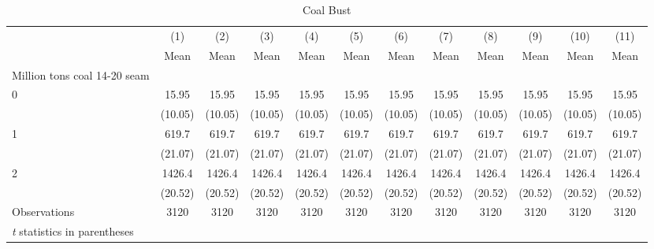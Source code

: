 \begin{table}[htbp]\centering
\caption{Coal Bust}
\begin{tabular}{l*{11}{c}}
\hline\hline
                    &\multicolumn{1}{c}{(1)}&\multicolumn{1}{c}{(2)}&\multicolumn{1}{c}{(3)}&\multicolumn{1}{c}{(4)}&\multicolumn{1}{c}{(5)}&\multicolumn{1}{c}{(6)}&\multicolumn{1}{c}{(7)}&\multicolumn{1}{c}{(8)}&\multicolumn{1}{c}{(9)}&\multicolumn{1}{c}{(10)}&\multicolumn{1}{c}{(11)}\\
                    &\multicolumn{1}{c}{Mean}&\multicolumn{1}{c}{Mean}&\multicolumn{1}{c}{Mean}&\multicolumn{1}{c}{Mean}&\multicolumn{1}{c}{Mean}&\multicolumn{1}{c}{Mean}&\multicolumn{1}{c}{Mean}&\multicolumn{1}{c}{Mean}&\multicolumn{1}{c}{Mean}&\multicolumn{1}{c}{Mean}&\multicolumn{1}{c}{Mean}\\
\hline
Million tons coal 14-20 seam&            &            &            &            &            &            &            &            &            &            &            \\
0                   &       15.95&       15.95&       15.95&       15.95&       15.95&       15.95&       15.95&       15.95&       15.95&       15.95&       15.95\\
                    &     (10.05)&     (10.05)&     (10.05)&     (10.05)&     (10.05)&     (10.05)&     (10.05)&     (10.05)&     (10.05)&     (10.05)&     (10.05)\\
[1em]
1                   &       619.7&       619.7&       619.7&       619.7&       619.7&       619.7&       619.7&       619.7&       619.7&       619.7&       619.7\\
                    &     (21.07)&     (21.07)&     (21.07)&     (21.07)&     (21.07)&     (21.07)&     (21.07)&     (21.07)&     (21.07)&     (21.07)&     (21.07)\\
[1em]
2                   &      1426.4&      1426.4&      1426.4&      1426.4&      1426.4&      1426.4&      1426.4&      1426.4&      1426.4&      1426.4&      1426.4\\
                    &     (20.52)&     (20.52)&     (20.52)&     (20.52)&     (20.52)&     (20.52)&     (20.52)&     (20.52)&     (20.52)&     (20.52)&     (20.52)\\
\hline
Observations        &        3120&        3120&        3120&        3120&        3120&        3120&        3120&        3120&        3120&        3120&        3120\\
\hline\hline
\multicolumn{12}{l}{\footnotesize \textit{t} statistics in parentheses}\\
\end{tabular}
\end{table}
